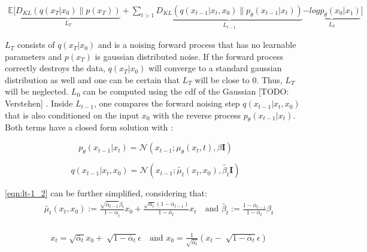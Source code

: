 \begin{equation}
  \label{eqn:vlb3}
  \begin{align*}
   \mathbb{E}\biggl[\underbrace{D_{KL}(q(x_{T}|x_0) \parallel p(x_T))}_{L_T} + \sum_{t>1}^{} \underbrace{  D_{KL}(q(x_{t-1}|x_t,x_0) \parallel p_\theta(x_{t-1}|x_t)) }_{L_{t-1}}  \underbrace{ -log p_\theta(x_0|x_1) }_{L_{0}}\biggr]
  \end{align*}
\end{equation}

$L_T$ consists of $q(x_{T}|x_0)$ and is a noising forward process that has no learnable parameters and $p(x_T)$ is gaussian distributed noise.
If the forward process correctly destroys the data, $q(x_{T}|x_0)$ will converge to a standard gaussian distribution as well and one can be certain that $L_T$ will be close to $0$.
Thus, $L_T$ will be neglected.
$L_{0}$ can be computed using the \gls{cdf} of the Gaussian [TODO: Verstehen] \cite{nichol2021ImprovedDenoisingDiffusion}.
Inside $L_{t-1}$, one compares the forward noising step $q(x_{t-1}|x_t,x_0)$ that is also conditioned on the input $x_0$ with the reverse process $p_\theta(x_{t-1}|x_t)$.
Both terms have a closed form solution with \cite{ho2020DenoisingDiffusionProbabilistic}:

\begin{equation}
  \label{eqn:lt-1_1}
  p_\theta(x_{t-1}|x_t)= \mathcal{N}(x_{t-1};\mu_\theta(x_t,t), \beta\textbf{I})
\end{equation}

\begin{equation}
  \label{eqn:lt-1_2}
q(x_{t-1}|x_t,x_0) = \mathcal{N}(x_{t-1};\tilde{\mu_t}(x_t,x_0), \tilde{\beta_t}\textbf{I})
\end{equation}


\autoref{eqn:lt-1_2} can be further simplified, considering that:
\begin{equation}
  \begin{align}
    &\tilde{\mu_t}(x_t, x_0) := \frac{\sqrt{\bar{\alpha}_{t-1}}\beta_t}{1 - \alpha_{\bar{t}}}x_0 +   \frac{\sqrt{\alpha_t}(1-\bar{\alpha}_{t-1})}{1 - \bar{\alpha}_{t}}x_t \quad \textrm{and }
    \tilde{\beta_t}:=\frac{1-\bar{\alpha}_{t-1}}{1-\bar{\alpha}_t}\beta_t \nonumber\\
  \end{align}
\end{equation}
    
\begin{equation}
  \begin{align}
    &x_t = \sqrt{\bar{\alpha}_{t}}x_0+\sqrt[]{1-\bar{\alpha}_t}\epsilon \quad\textrm{and }
    x_0 = \frac{1}{\sqrt{\bar{\alpha}_t}}(x_t-\sqrt[]{1-\bar{\alpha}_t}\epsilon) \nonumber\\
  \end{align}
\end{equation}


